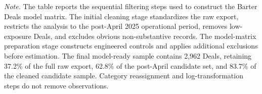 \begin{table}[htbp]
\begin{flushleft}
\footnotesize
\textit{Note.} The table reports the sequential filtering steps used to construct the Barter Deals model matrix. The initial cleaning stage standardizes the raw export, restricts the analysis to the post-April 2025 operational period, removes low-exposure Deals, and excludes obvious non-substantive records. The model-matrix preparation stage constructs engineered controls and applies additional exclusions before estimation. The final model-ready sample contains 2{,}962 Deals, retaining 37.2\% of the full raw export, 62.8\% of the post-April candidate set, and 83.7\% of the cleaned candidate sample. Category reassignment and log-transformation steps do not remove observations.
\end{flushleft}
\end{table}










